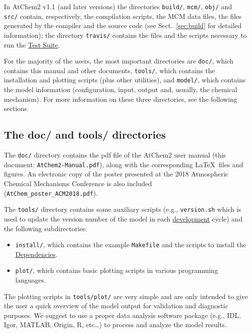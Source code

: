 In AtChem2 v1.1 (and later versions) the directories \texttt{build/},
\texttt{mcm/}, \texttt{obj/} and \texttt{src/} contain, respectively,
the compilation scripts, the MCM data files, the files generated by
the compiler and the source code (see Sect.~\ref{sec:build} for
detailed information); the directory \texttt{travis/} contains the
files and the scripts necessary to run the
\hyperref[sec:test-suite]{Test Suite}.

For the majority of the users, the most important directories are
\texttt{doc/}, which contains this manual and other documents,
\texttt{tools/}, which contains the installation and plotting scripts
(plus other utilities), and \texttt{model/}, which contains the model
information (configuration, input, output and, usually, the chemical
mechanism). For more information on these three directories, see the
following sections.

\subsection{The doc/ and tools/ directories} \label{subsec:doc-tools-directories}

The \texttt{doc/} directory contains the pdf file of the AtChem2 user
manual (this document: \texttt{AtChem2-Manual.pdf}), along with the
corresponding \LaTeX\ files and figures. An electronic copy of the
poster presented at the 2018 Atmospheric Chemical Mechanisms
Conference \citep{sommariva_2018} is also included
(\texttt{AtChem\_poster\_ACM2018.pdf}).

The \texttt{tools/} directory contains some auxiliary scripts (e.g.,
\texttt{version.sh} which is used to update the version number of the
model in each \hyperref[ch:development]{development} cycle) and the
following subdirectories:

\begin{itemize}
\item \texttt{install/}, which contains the example \texttt{Makefile}
  and the scripts to install the \hyperref[sec:dependencies]{Dependencies}.
\item \texttt{plot/}, which contains basic plotting scripts in various
  programming languages.
\end{itemize}

The plotting scripts in \texttt{tools/plot/} are very simple and are
only intended to give the user a quick overview of the model output
for validation and diagnostic purposes. We suggest to use a proper
data analysis software package (e.g., IDL, Igor, MATLAB, Origin, R,
etc\ldots) to process and analyze the model results.

